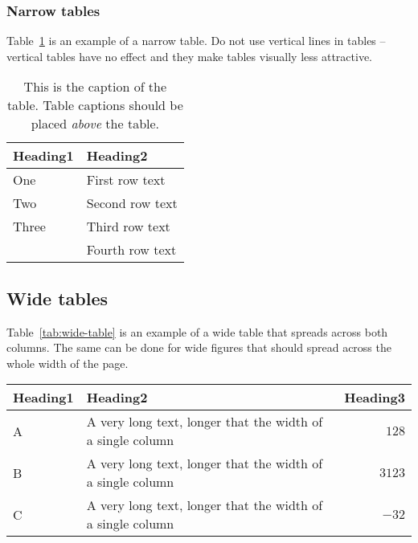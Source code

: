 \documentclass[10pt, a4paper]{article}
\begin{document}
\subsubsection{Narrow tables}

Table~\ref{tab:narrow-table} is an example of a narrow table. Do not use vertical lines in tables -- vertical tables have no effect and they make tables visually less attractive.

\begin{table}
\caption{This is the caption of the table. Table captions should be placed \textit{above} the table.}
\label{tab:narrow-table}
\begin{center}
\begin{tabular}{ll}
\toprule
Heading1 & Heading2 \\
\midrule
One & First row text \\
Two   & Second row text \\
Three   & Third row text \\
      & Fourth row text \\
\bottomrule
\end{tabular}
\end{center}
\end{table}

\subsection{Wide tables}

Table~\ref{tab:wide-table} is an example of a wide table that spreads across both columns. The same can be done for wide figures that should spread across the whole width of the page. 

\begin{table*}
\caption{Wide-table caption}
\label{tab:wide-table}
\begin{center}
\begin{tabular}{llr}
\toprule
Heading1 & Heading2 & Heading3\\
\midrule
A & A very long text, longer that the width of a single column & $128$\\
B & A very long text, longer that the width of a single column & $3123$\\
C & A very long text, longer that the width of a single column & $-32$\\
\bottomrule
\end{tabular}
\end{center}
\end{table*}
\end{document}
